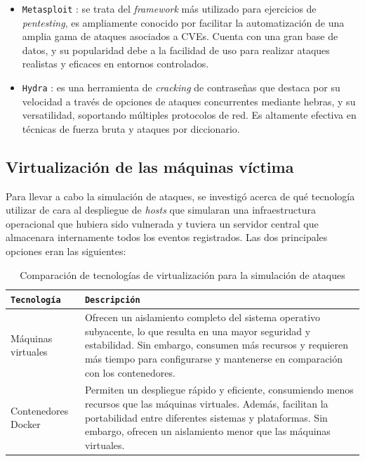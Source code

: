 \begin{itemize}
    \item \texttt{Metasploit} \cite{Kennedy2011}: se trata del \textit{framework} más utilizado para ejercicios de \textit{pentesting}, es ampliamente conocido por facilitar la automatización de una amplia gama de ataques asociados a \gls{CVE}s. Cuenta con una gran base de datos, y su popularidad debe a la facilidad de uso para realizar ataques realistas y eficaces en entornos controlados.\\
    \item \texttt{Hydra} \cite{Beale2004}: es una herramienta de \textit{cracking} de contraseñas que destaca por su velocidad a través de opciones de ataques concurrentes mediante hebras, y su versatilidad, soportando múltiples protocolos de red. Es altamente efectiva en técnicas de fuerza bruta y ataques por diccionario.
\end{itemize}

\subsection{Virtualización de las máquinas víctima}

Para llevar a cabo la simulación de ataques, se investigó acerca de qué tecnología utilizar de cara al despliegue de \textit{hosts} que simularan una infraestructura operacional que hubiera sido vulnerada y tuviera un servidor central que almacenara internamente todos los eventos registrados. Las dos principales opciones eran las siguientes:

\begin{table}[h]
\centering
\footnotesize
\begin{tabularx}{\linewidth}{|l|X|}
\hline
\rowcolor{graylight}\texttt{Tecnología} & \texttt{Descripción} \\
\hline
Máquinas virtuales & Ofrecen un aislamiento completo del sistema operativo subyacente, lo que resulta en una mayor seguridad y estabilidad. Sin embargo, consumen más recursos y requieren más tiempo para configurarse y mantenerse en comparación con los contenedores. \\
\hline
Contenedores Docker & Permiten un despliegue rápido y eficiente, consumiendo menos recursos que las máquinas virtuales. Además, facilitan la portabilidad entre diferentes sistemas y plataformas. Sin embargo, ofrecen un aislamiento menor que las máquinas virtuales. \\
\hline
\end{tabularx}
\caption{Comparación de tecnologías de virtualización para la simulación de ataques}
\end{table}

